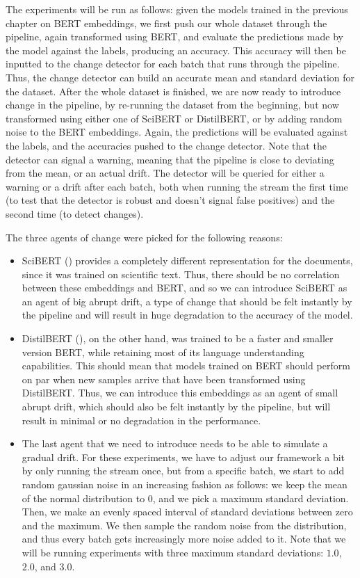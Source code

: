 \documentclass[12pt]{extreport}
\begin{document}
The experiments will be run as follows: given the models trained in the previous chapter on BERT embeddings, we first push our whole dataset through the pipeline, again transformed using BERT, and evaluate the predictions made by the model against the labels, producing an accuracy. This accuracy will then be inputted to the change detector for each batch that runs through the pipeline. Thus, the change detector can build an accurate mean and standard deviation for the dataset. After the whole dataset is finished, we are now ready to introduce change in the pipeline, by re-running the dataset from the beginning, but now transformed using either one of SciBERT or DistilBERT, or by adding random noise to the BERT embeddings. Again, the predictions will be evaluated against the labels, and the accuracies pushed to the change detector. Note that the detector can signal a warning, meaning that the pipeline is close to deviating from the mean, or an actual drift. The detector will be queried for either a warning or a drift after each batch, both when running the stream the first time (to test that the detector is robust and doesn't signal false positives) and the second time (to detect changes).

The three agents of change were picked for the following reasons:
\begin{itemize}
    \item SciBERT (\cite{scibert}) provides a completely different representation for the documents, since it was trained on scientific text. Thus, there should be no correlation between these embeddings and BERT, and so we can introduce SciBERT as an agent of big abrupt drift, a type of change that should be felt instantly by the pipeline and will result in huge degradation to the accuracy of the model.
    \item DistilBERT (\cite{distilbert}), on the other hand, was trained to be a faster and smaller version BERT, while retaining most of its language understanding capabilities. This should mean that models trained on BERT should perform on par when new samples arrive that have been transformed using DistilBERT. Thus, we can introduce this embeddings as an agent of small abrupt drift, which should also be felt instantly by the pipeline, but will result in minimal or no degradation in the performance.
    \item The last agent that we need to introduce needs to be able to simulate a gradual drift. For these experiments, we have to adjust our framework a bit by only running the stream once, but from a specific batch, we start to add random gaussian noise in an increasing fashion as follows: we keep the mean of the normal distribution to 0, and we pick a maximum standard deviation. Then, we make an evenly spaced interval of standard deviations between zero and the maximum. We then sample the random noise from the distribution, and thus every batch gets increasingly more noise added to it. Note that we will be running experiments with three maximum standard deviations: $1.0$, $2.0$, and $3.0$.
\end{itemize}
\end{document}
